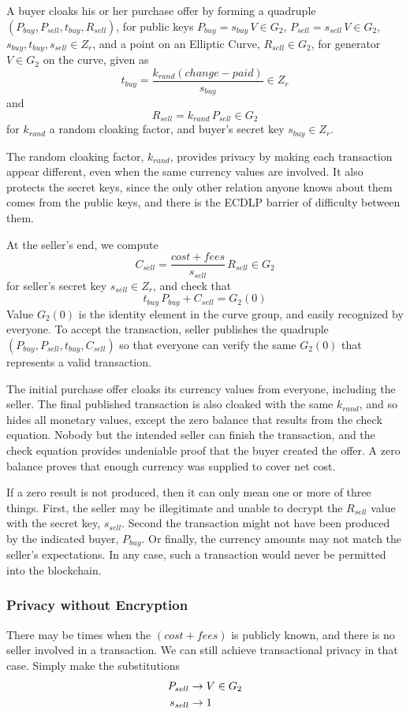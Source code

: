 \documentclass{yellowpaper}
\begin{document}
A buyer cloaks his or her purchase offer by forming a quadruple $(P_{buy}, P_{sell}, t_{buy}, R_{sell})$, for public keys $P_{buy} = s_{buy} \, V \in G_2$, $P_{sell} = s_{sell} \, V \in G_2$, $s_{buy}, t_{buy}, s_{sell} \in Z_r$, and a point on an Elliptic Curve, $R_{sell} \in G_2$, for generator $V \in G_2$ on the curve, given as
$$t_{buy} = \frac{k_{rand} (change - paid)}{s_{buy}} \in Z_r$$
and
$$R_{sell} = k_{rand}\, P_{sell} \in G_2$$
for $k_{rand}$ a random cloaking factor, and buyer's secret key $s_{buy} \in Z_r$.

The random cloaking factor, $k_{rand}$, provides privacy by making each transaction appear different, even when the same currency values are involved. It also protects the secret keys, since the only other relation anyone knows about them comes from the public keys, and there is the ECDLP barrier of difficulty between them.

At the seller's end, we compute
$$C_{sell} = \frac{cost + fees}{s_{sell}} \, R_{sell} \in G_2$$
for seller's secret key $s_{sell} \in Z_r$, and check that
$$t_{buy}\, P_{buy} + C_{sell} = G_2(0)$$
Value $G_2(0)$ is the identity element in the curve group, and easily  recognized by everyone. To accept the transaction, seller publishes the quadruple $(P_{buy}, P_{sell}, t_{buy}, C_{sell})$ so that everyone can verify the same $G_2(0)$ that represents a valid transaction.

The initial purchase offer cloaks its currency values from everyone, including the seller. The final published transaction is also cloaked with the same $k_{rand}$, and so hides all monetary values, except the zero balance that results from the check equation. Nobody but the intended seller can finish the transaction, and the check equation provides undeniable proof that the buyer created the offer. A zero balance proves that enough currency was supplied to cover net cost.

If a zero result is not produced, then it can only mean one or more of three things. First, the seller may be illegitimate and unable to decrypt the $R_{sell}$ value with the secret key, $s_{sell}$. Second the transaction might not have been produced by the indicated buyer, $P_{buy}$. Or finally, the currency amounts may not match the seller's expectations. In any case, such a transaction would never be permitted into the blockchain.
\subsubsection{Privacy without Encryption}
There may be times when the $(cost + fees)$ is publicly known, and there is no seller involved in a transaction. We can still achieve transactional privacy in that case. Simply make the substitutions
\begin{align}
P_{sell} &\to V \in G_2 \notag \\
s_{sell} &\to 1 \notag
\end{align}
\end{document}
